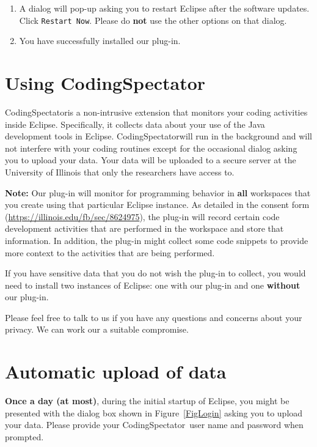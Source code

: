 \documentclass{article}
\newcommand{\fig}[1]{\imgsrc{#1.png}}
\newcommand\fig[1]{\texttt{[image: \#1]}}%
\newcommand\codspec{CodingSpectator}
\newcommand\infonote[1]{\textbf{Note: }#1}
\newcommand\uiref[1]{\texttt{#1}}
\begin{document}
\begin{enumerate}
\begin{figure}[h]
%
\centering
%
\fig{figs/warning}
%
\caption{\label{FigUnsignedWarning}The dialog that warns about unsigned content
implies that Eclipse has failed to install \codspec.}
%
\end{figure}

\item A dialog will pop-up asking you to restart Eclipse after the software
updates. Click \uiref{Restart Now}. Please do \textbf{not} use the other options
on that dialog.

\item You have successfully installed our plug-in.
%
\end{enumerate}
%
\section{Using \codspec}
%
\codspec is a non-intrusive extension that monitors your coding activities
inside Eclipse. Specifically, it collects data about your use of the Java
development tools in Eclipse. \codspec will run in the background and will not
interfere with your coding routines except for the occasional dialog asking you
to upload your data. Your data will be uploaded to a secure server at the
University of Illinois that only the researchers have access to.

\infonote{Our plug-in will monitor for programming behavior in \textbf{all}
workspaces that you create using that particular Eclipse instance. As detailed
in the consent form (\url{https://illinois.edu/fb/sec/8624975}), the plug-in
will record certain code development activities that are performed in the
workspace and store that information. In addition, the plug-in might collect
some code snippets to provide more context to the activities that are being
performed.

If you have sensitive data that you do not wish the plug-in to collect, you
would need to install two instances of Eclipse: one with our plug-in and one
\textbf{without} our plug-in.

Please feel free to talk to us if you have any questions and concerns about your
privacy. We can work our a suitable compromise.}
%
\section{Automatic upload of data}

\textbf{Once a day (at most)}, during the initial startup of Eclipse, you might
be presented with the dialog box shown in Figure~\ref{FigLogin} asking you to
upload your data. Please provide your \codspec\ user name and password when
prompted.
\end{document}
